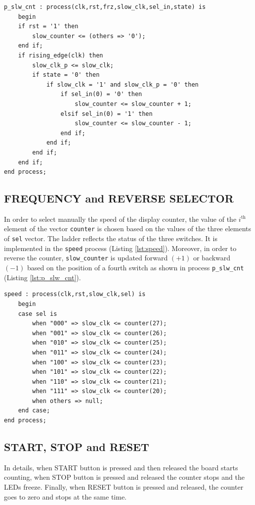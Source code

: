 \documentclass[11pt, a4paper]{article}
\begin{document}
\begin{lstlisting}[style=vhdl,label={lst:p_slw_cnt},caption={{\footnotesize\texttt{p\_slw\_cnt}} process.}]
p_slw_cnt : process(clk,rst,frz,slow_clk,sel_in,state) is
    begin
    if rst = '1' then
        slow_counter <= (others => '0');
    end if;
    if rising_edge(clk) then
        slow_clk_p <= slow_clk;
        if state = '0' then
            if slow_clk = '1' and slow_clk_p = '0' then
                if sel_in(0) = '0' then
                    slow_counter <= slow_counter + 1;
                elsif sel_in(0) = '1' then
                    slow_counter <= slow_counter - 1;
                end if;
            end if;
        end if;
    end if;
end process;\end{lstlisting}



\subsection{FREQUENCY and REVERSE SELECTOR}
In order to select manually the speed of the display counter, the value of the \(i^\text{th}\) element of the vector {\footnotesize\texttt{counter}} is chosen based on the values of the three elements of {\footnotesize\texttt{sel}} vector. The ladder reflects the status of the three switches. It is implemented in the {\footnotesize\texttt{speed}} process (Listing \ref{lst:speed}).
Moreover, in order to reverse the counter, {\footnotesize\texttt{slow\_counter}} is updated forward \( (+1)\) or backward \((-1)\) based on the position of a fourth switch as shown in process {\footnotesize\texttt{p\_slw\_cnt}} (Listing \ref{lst:p_slw_cnt}).

\begin{lstlisting}[style=vhdl,label={lst:speed},caption={{\footnotesize\texttt{speed}} process.}]
speed : process(clk,rst,slow_clk,sel) is
    begin
    case sel is
        when "000" => slow_clk <= counter(27);
        when "001" => slow_clk <= counter(26);
        when "010" => slow_clk <= counter(25);
        when "011" => slow_clk <= counter(24);
        when "100" => slow_clk <= counter(23);
        when "101" => slow_clk <= counter(22);
        when "110" => slow_clk <= counter(21);
        when "111" => slow_clk <= counter(20);
        when others => null;
    end case;
end process;\end{lstlisting}



\subsection{START, STOP and RESET}
In details, when START button is pressed and then released the board starts counting, when STOP button is pressed and released the counter stops and the LEDs freeze. Finally, when RESET button is pressed and released, the counter goes to zero and stops at the same time.
\end{document}
